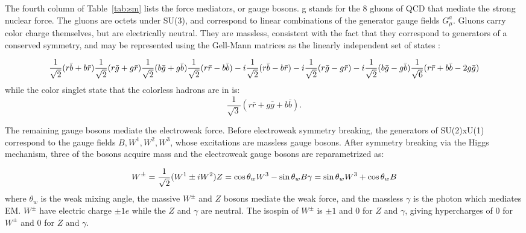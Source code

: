 \indent The fourth column of Table~\ref{tab:sm} lists the force mediators, or gauge bosons. g stands for the 8 gluons of QCD that mediate the strong nuclear force. The gluons are octets under SU(3), and correspond to linear combinations of the generator gauge fields $G^a_\mu$. Gluons carry color charge themselves, but are electrically neutral. They are massless, consistent with the fact that they correspond to generators of a conserved symmetry, and may be represented using the Gell-Mann matrices as the linearly independent set of states \cite{Griffiths}:

\begin{equation}
\frac{1}{\sqrt{2}}(r\bar{b} + b\bar{r}) \\
\frac{1}{\sqrt{2}}(r\bar{g} + g\bar{r}) \\
\frac{1}{\sqrt{2}}(b\bar{g} + g\bar{b}) \\
\frac{1}{\sqrt{2}}(r\bar{r} - b\bar{b}) \\
-i \frac{1}{\sqrt{2}}(r\bar{b} - b\bar{r}) \\
-i \frac{1}{\sqrt{2}}(r\bar{g} - g\bar{r}) \\
-i \frac{1}{\sqrt{2}}(b\bar{g} - g\bar{b}) \\
\frac{1}{\sqrt{6}}(r\bar{r} + b\bar{b} -2g\bar{g}) \\
\end{equation}
while the color singlet state that the colorless hadrons are in is:
\begin{equation}
\frac{1}{\sqrt{3}}(r\bar{r} + g\bar{g} + b\bar{b}).
\end{equation}

\indent The remaining gauge bosons mediate the electroweak force. Before electroweak symmetry breaking, the generators of SU(2)xU(1) correspond to the gauge fields $B, W^1, W^2, W^3$, whose excitations are massless gauge bosons. After symmetry breaking via the Higgs mechanism, three of the bosons acquire mass and the electroweak gauge bosons are reparametrized as:

\begin{equation}
W^\pm = \frac{1}{\sqrt{2}}(W^1 \pm iW^2) \\
Z = \cos\theta_w W^3 - \sin\theta_w B \\
\gamma = \sin\theta_w W^3 + \cos\theta_w B \\
\end{equation}
where $\theta_w$ is the weak mixing angle, the massive $W^\pm$ and $Z$ bosons mediate the weak force, and the massless $\gamma$ is the photon which mediates EM. $W^\pm$ have electric charge $\pm 1e$ while the $Z$ and $\gamma$ are neutral. The isospin of $W^\pm$ is $\pm1$ and 0 for $Z$ and $\gamma$, giving hypercharges of $0$ for $W^\pm$ and 0 for $Z$ and $\gamma$. 

